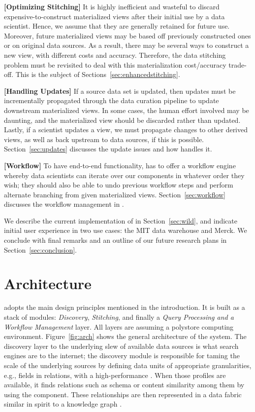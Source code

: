 {\bf [Optimizing Stitching]} It is highly inefficient and wasteful to  discard expensive-to-construct materialized views after their initial use by a data scientist.  Hence, we assume that they are generally retained for future use.  Moreover, future materialized views  may be based off previously constructed ones or on original data sources.  As a result, there may be several ways to construct a new view, with different  costs and accuracy. Therefore, the data stitching problem must be revisited to deal with this materialization cost/accuracy trade-off.  This is the subject of Sections~\ref{sec:enhancedstitching}.

{\bf [Handling Updates]}  If a source data set is updated, then
updates must be incrementally propagated through the data curation pipeline to
update downstream materialized views.  In some cases, the human effort involved may be
daunting, and the materialized view should be discarded rather than updated.  Lastly, if a
scientist updates a view, we must propagate changes to other derived views, as well as back upstream to data sources, if this is possible. Section~\ref{sec:updates} discusses the update issues and how \dcv handles it.

{\bf [Workflow]} To have end-to-end functionality, \dcv has to offer a workflow engine whereby data scientists can iterate over our components in whatever order they wish; they should also be able to undo previous workflow steps and perform alternate branching from given materialized views. Section~\ref{sec:workflow} discusses the  workflow management in \dcv.

We describe the  current implementation of \dcv  in Section~\ref{sec:wild}, and indicate initial user experience in two use cases: the  MIT data warehouse and Merck. We conclude with final remarks and an  outline of  our future research plans in Section~\ref{sec:conclusion}.


\section{Architecture}
\label{sec:arch}

\dcv adopts the main design principles mentioned in the introduction. %
It is built as a stack of modules: {\em Discovery}, {\em Stitching}, and finally 
a {\em Query Processing and a Workflow Management} layer. All layers are assuming a polystore computing environment. Figure~\ref{fig:arch} shows the
general architecture of the \dcv system. 
The discovery layer to the underlying slew of available data sources is what search engines are to the
internet; the discovery module is responsible for taming the scale of the underlying
sources by defining data units of appropriate granularities, e.g., fields in
relations, with a high-performance . When those profiles are
available, it finds relations such as schema or content similarity among them by
using the  component. These relationships are then
represented in a data fabric similar in spirit to a knowledge graph
\cite{DBLP:conf/semweb/AuerBKLCI07,DBLP:conf/sigmod/BollackerEPST08,DBLP:conf/www/SuchanekKW07}.

